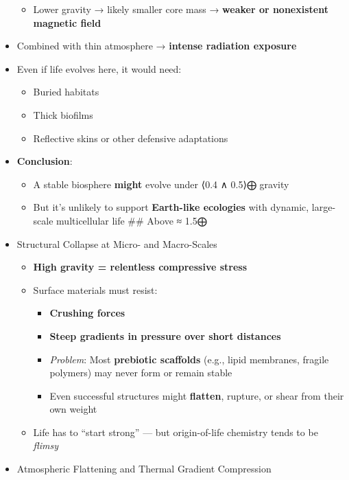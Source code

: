 \documentclass[
  letterpaper,
]{book}
\providecommand{\tightlist}{%
  \setlength{\itemsep}{0pt}\setlength{\parskip}{0pt}}
\begin{document}
\begin{itemize}
  \begin{itemize}
  \tightlist
  \item
    Lower gravity → likely smaller core mass → \textbf{weaker or
    nonexistent magnetic field}\\
  \end{itemize}
\item
  Combined with thin atmosphere → \textbf{intense radiation exposure}\\
\item
  Even if life evolves here, it would need:

  \begin{itemize}
  \tightlist
  \item
    Buried habitats\\
  \item
    Thick biofilms\\
  \item
    Reflective skins or other defensive adaptations
  \end{itemize}
\item
  \textbf{Conclusion}:

  \begin{itemize}
  \tightlist
  \item
    A stable biosphere \textbf{might} evolve under ⟨0.4 ∧ 0.5⟩⨁ gravity
  \item
    But it's unlikely to support \textbf{Earth-like ecologies} with
    dynamic, large-scale multicellular life \#\# Above ≈ 1.5⨁
  \end{itemize}
\item
  Structural Collapse at Micro- and Macro-Scales

  \begin{itemize}
  \tightlist
  \item
    \textbf{High gravity = relentless compressive stress}
  \item
    Surface materials must resist:

    \begin{itemize}
    \tightlist
    \item
      \textbf{Crushing forces}\\
    \item
      \textbf{Steep gradients in pressure over short distances}
    \item
      \emph{Problem}: Most \textbf{prebiotic scaffolds} (e.g., lipid
      membranes, fragile polymers) may never form or remain stable\\
    \item
      Even successful structures might \textbf{flatten}, rupture, or
      shear from their own weight
    \end{itemize}
  \item
    Life has to ``start strong'' --- but origin-of-life chemistry tends
    to be \emph{flimsy}
  \end{itemize}
\item
  Atmospheric Flattening and Thermal Gradient Compression


\end{itemize}
\end{document}
